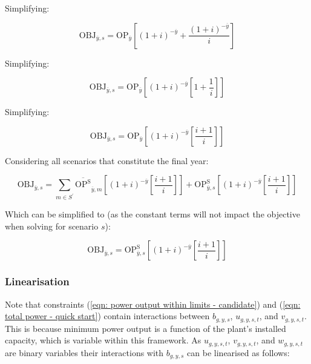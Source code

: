 \documentclass{article}
\newcommand{\sScenarios}{S}
\newcommand{\iGenerator}{g}
\newcommand{\iYear}{y}
\newcommand{\iYearTerminal}{\overline{\iYear}}
\newcommand{\iScenario}{s}
\newcommand{\iScenarioAlias}{m}
\newcommand{\iInterval}{t}
\newcommand{\cOperatingCost}[1][\iYear,\iScenario]{\mathrm{OP}_{#1}}
\newcommand{\cInterestRate}{i}
\newcommand{\cObjectiveFunction}{\mathrm{OBJ}}
\newcommand{\cOperatingCostScenario}[1][\iYear,\iScenario]{\mathrm{OP}^{\mathrm{\sScenarios}}_{#1}}
\newcommand{\vStartupIndicator}[1][\iGenerator,\iYear,\iScenario,\iInterval]{v_{#1}}
\newcommand{\vShutdownIndicator}[1][\iGenerator,\iYear,\iScenario,\iInterval]{w_{#1}}
\newcommand{\vOnIndicator}[1][\iGenerator,\iYear,\iScenario,\iInterval]{u_{#1}}
\newcommand{\vInstalledCapacityTotalScenario}[1][\iGenerator,\iYear,\iScenario]{b_{#1}}
\begin{document}
Simplifying:

\begin{equation}
	\cObjectiveFunction_{\iYearTerminal,\iScenario} = \cOperatingCost[\iYearTerminal]\left[(1+\cInterestRate)^{-\iYearTerminal}  + \frac{(1+\cInterestRate)^{-\iYearTerminal}}{\cInterestRate}\right]
\end{equation}

Simplifying:

\begin{equation}
	\cObjectiveFunction_{\iYearTerminal,\iScenario} = \cOperatingCost[\iYearTerminal] \left[(1+\cInterestRate)^{-\iYearTerminal} \left[1 + \frac{1}{\cInterestRate}\right]\right]
\end{equation}

Simplifying:

\begin{equation}
	\cObjectiveFunction_{\iYearTerminal,\iScenario} = \cOperatingCost[\iYearTerminal] \left[(1+\cInterestRate)^{-\iYearTerminal} \left[ \frac{\cInterestRate + 1}{\cInterestRate}\right]\right]
\end{equation}

Considering all scenarios that constitute the final year:

\begin{equation}
	\cObjectiveFunction_{\iYearTerminal,\iScenario} = \sum\limits_{\iScenarioAlias \in \sScenarios^{\prime}} \overline{\cOperatingCostScenario[]}_{\iYearTerminal,\iScenarioAlias} \left[(1+\cInterestRate)^{-\iYearTerminal} \left[\frac{\cInterestRate + 1}{\cInterestRate}\right]\right] + \cOperatingCostScenario[\iYearTerminal,\iScenario] \left[(1+\cInterestRate)^{-\iYearTerminal} \left[\frac{\cInterestRate + 1}{\cInterestRate}\right]\right] 
\end{equation}

Which can be simplified to (as the constant terms will not impact the objective when solving for scenario $\iScenario$):

\begin{equation}
\cObjectiveFunction_{\iYearTerminal,\iScenario} = \cOperatingCostScenario[\iYearTerminal,\iScenario] \left[(1+\cInterestRate)^{-\iYearTerminal} \left[\frac{\cInterestRate + 1}{\cInterestRate}\right]\right] 
\end{equation}

\subsubsection{Linearisation}
Note that constraints (\ref{eqn: power output within limits - candidate}) and (\ref{eqn: total power - quick start}) contain interactions between $\vInstalledCapacityTotalScenario$, $\vOnIndicator$, and $\vStartupIndicator$. This is because minimum power output is a function of the plant's installed capacity, which is variable within this framework. As $\vOnIndicator$, $\vStartupIndicator$, and $\vShutdownIndicator$ are binary variables their interactions with $\vInstalledCapacityTotalScenario$ can be linearised as follows:
\end{document}
